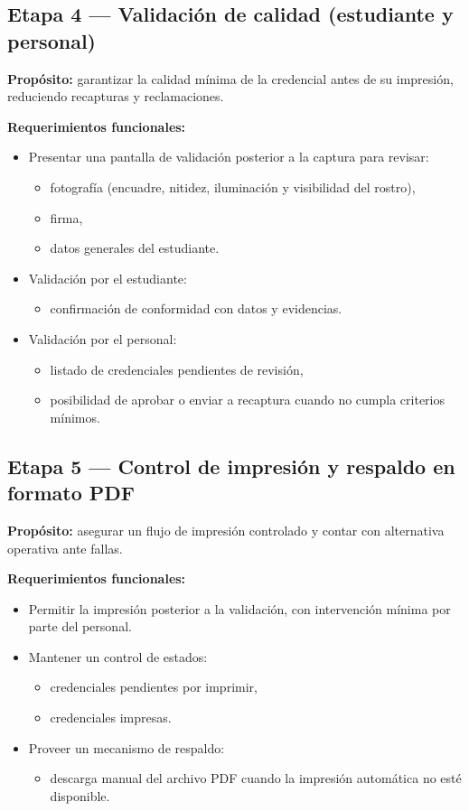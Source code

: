 \documentclass[12pt,a4paper]{article}
\begin{document}
\subsection{Etapa 4 --- Validación de calidad (estudiante y personal)}
\textbf{Propósito:} garantizar la calidad mínima de la credencial antes de su impresión, reduciendo recapturas y reclamaciones.

\textbf{Requerimientos funcionales:}
\begin{itemize}
  \item Presentar una pantalla de validación posterior a la captura para revisar:
  \begin{itemize}
    \item fotografía (encuadre, nitidez, iluminación y visibilidad del rostro),
    \item firma,
    \item datos generales del estudiante.
  \end{itemize}
  \item Validación por el estudiante:
  \begin{itemize}
    \item confirmación de conformidad con datos y evidencias.
  \end{itemize}
  \item Validación por el personal:
  \begin{itemize}
    \item listado de credenciales pendientes de revisión,
    \item posibilidad de aprobar o enviar a recaptura cuando no cumpla criterios mínimos.
  \end{itemize}
\end{itemize}

\subsection{Etapa 5 --- Control de impresión y respaldo en formato PDF}
\textbf{Propósito:} asegurar un flujo de impresión controlado y contar con alternativa operativa ante fallas.

\textbf{Requerimientos funcionales:}
\begin{itemize}
  \item Permitir la impresión posterior a la validación, con intervención mínima por parte del personal.
  \item Mantener un control de estados:
  \begin{itemize}
    \item credenciales pendientes por imprimir,
    \item credenciales impresas.
  \end{itemize}
  \item Proveer un mecanismo de respaldo:
  \begin{itemize}
    \item descarga manual del archivo PDF cuando la impresión automática no esté disponible.
  \end{itemize}
\end{itemize}
\end{document}
